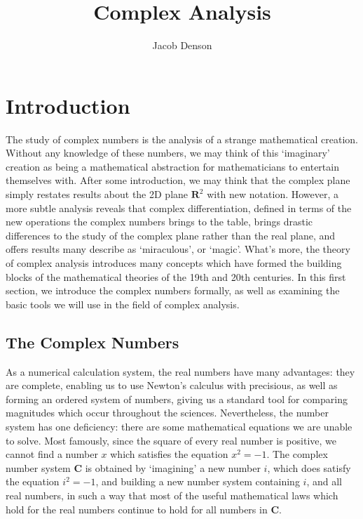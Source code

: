 

\title{Complex Analysis}
\author{Jacob Denson}



\maketitle
\tableofcontents
{}

\chapter{Introduction}

The study of complex numbers is the analysis of a strange mathematical creation. Without any knowledge of these numbers, we may think of this `imaginary' creation as being a mathematical abstraction for mathematicians to entertain themselves with. After some introduction, we may think that the complex plane simply restates results about the 2D plane $\mathbf{R}^2$ with new notation. However, a more subtle analysis reveals that complex differentiation, defined in terms of the new operations the complex numbers brings to the table, brings drastic differences to the study of the complex plane rather than the real plane, and offers results many describe as `miraculous', or `magic'. What's more, the theory of complex analysis introduces many concepts which have formed the building blocks of the mathematical theories of the 19th and 20th centuries. In this first section, we introduce the complex numbers formally, as well as examining the basic tools we will use in the field of complex analysis.

\section{The Complex Numbers}

As a numerical calculation system, the real numbers have many advantages: they are complete, enabling us to use Newton's calculus with precisious, as well as forming an ordered system of numbers, giving us a standard tool for comparing magnitudes which occur throughout the sciences. Nevertheless, the number system has one deficiency: there are some mathematical equations we are unable to solve. Most famously, since the square of every real number is positive, we cannot find a number $x$ which satisfies the equation $x^2 = -1$. The complex number system $\mathbf{C}$ is obtained by `imagining' a new number $i$, which does satisfy the equation $i^2 = -1$, and building a new number system containing $i$, and all real numbers, in such a way that most of the useful mathematical laws which hold for the real numbers continue to hold for all numbers in $\mathbf{C}$.

